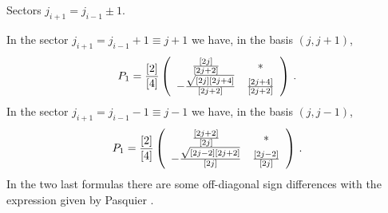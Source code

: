 \documentclass[11pt]{article}
\begin{document}
\begin{paragraph}{Sectors $j_{i+1} = j_{i-1}\pm 1$.}
 
In the sector $j_{i+1} = j_{i-1}+1 \equiv j+1$ we have, in the basis $(j,j+1)$, 
\begin{equation}
 P_1 = \frac{[2]}{[4]} \left( \begin{array}{cc} 
                               {[2j] \over [2j+2]} & * \\
                                 -{\sqrt{[2j][2j+4]} \over [2j+2]} &   {[2j+4] \over [2j+2]} \\
                              \end{array}
 \right) \,.
\end{equation}
%
In the sector $j_{i+1} = j_{i-1}-1 \equiv j-1$ we have, in the basis $(j,j-1)$, 
%
\begin{equation}
 P_1 = \frac{[2]}{[4]} \left( \begin{array}{cc} 
                               {[2j+2] \over [2j]} & * \\
                                 -{\sqrt{[2j-2][2j+2]} \over [2j]} &   {[2j-2] \over [2j]} \\
                              \end{array}
 \right) \,.
\end{equation}
%
In the two last formulas there are some off-diagonal sign differences with the expression given by Pasquier \cite{Vincent}.

\end{paragraph}





\medskip
  
\end{document}
